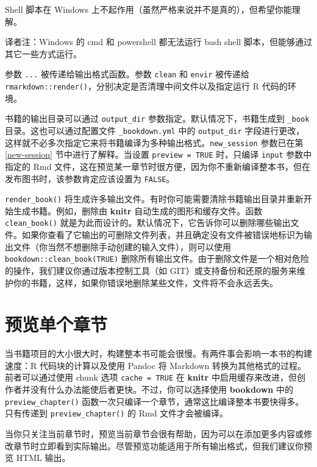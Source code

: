\documentclass[
  12pt,
]{krantz}
\renewenvironment{quote}{\begin{VF}}{\end{VF}}
\theoremstyle{definition}
\theoremstyle{definition}
\theoremstyle{definition}
\theoremstyle{definition}
\theoremstyle{remark}
\begin{document}
Shell 脚本在 Windows 上不起作用（虽然严格来说并不是真的），但希望你能理解。

\begin{quote}
译者注：Windows 的 cmd 和 powershell 都无法运行 bash shell 脚本，但能够通过其它一些方式运行。
\end{quote}

参数 \texttt{...} 被传递给输出格式函数。参数 \texttt{clean} 和 \texttt{envir} 被传递给 \texttt{rmarkdown::render()}，分别决定是否清理中间文件以及指定运行 R 代码的环境。

书籍的输出目录可以通过 \texttt{output\_dir} 参数指定。默认情况下，书籍生成到 \texttt{\_book} 目录。这也可以通过配置文件 \texttt{\_bookdown.yml} 中的 \texttt{output\_dir} 字段进行更改，这样就不必多次指定它来将书籍编译为多种输出格式。\texttt{new\_session} 参数已在第 \ref{new-session} 节中进行了解释。当设置 \texttt{preview\ =\ TRUE} 时，只编译 \texttt{input} 参数中指定的 Rmd 文件，这在预览某一章节时很方便，因为你不重新编译整本书，但在发布图书时，该参数肯定应该设置为 \texttt{FALSE}。

\texttt{render\_book()} 将生成许多输出文件。有时你可能需要清除书籍输出目录并重新开始生成书籍。例如，删除由 \textbf{knitr} 自动生成的图形和缓存文件。函数 \texttt{clean\_book()} 就是为此而设计的。默认情况下，它告诉你可以删除哪些输出文件。如果你查看了它输出的可删除文件列表，并且确定没有文件被错误地标识为输出文件（你当然不想删除手动创建的输入文件），则可以使用 \texttt{bookdown::clean\_book(TRUE)} 删除所有输出文件。由于删除文件是一个相对危险的操作，我们建议你通过版本控制工具（如 GIT）或支持备份和还原的服务来维护你的书籍，这样，如果你错误地删除某些文件，文件将不会永远丢失。

\hypertarget{ux9884ux89c8ux5355ux4e2aux7ae0ux8282}{%
\section{预览单个章节}\label{ux9884ux89c8ux5355ux4e2aux7ae0ux8282}}

当书籍项目的大小很大时，构建整本书可能会很慢。有两件事会影响一本书的构建速度：R 代码块的计算以及使用 Pandoc 将 Markdown 转换为其他格式的过程。前者可以通过使用 chunk 选项 \texttt{cache\ =\ TRUE} 在 \textbf{knitr} 中启用缓存来改进，但创作者并没有什么办法能使后者更快。不过，你可以选择使用 \textbf{bookdown} 中的 \texttt{preview\_chapter()} 函数一次只编译一个章节，通常这比编译整本书要快得多。只有传递到 \texttt{preview\_chapter()} 的 Rmd 文件才会被编译。

当你只关注当前章节时，预览当前章节会很有帮助，因为可以在添加更多内容或修改章节时立即看到实际输出。尽管预览功能适用于所有输出格式，但我们建议你预览 HTML 输出。
\end{document}
